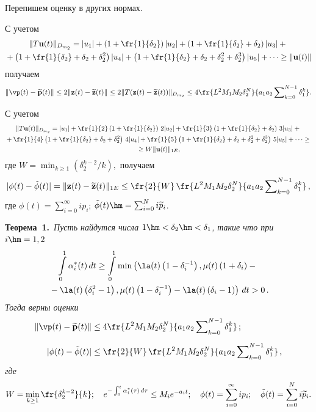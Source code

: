 \smallskip

Перепишем оценку в других нормах.

С  учетом
\begin{multline*}
\|T\vu(t)\|_{D_{m_2}}=|u_1|+\left(1+\fr{1}{\delta_2}\right)|u_2|+
\left(1+\fr{1}{\delta_2}+\delta_2\right)|u_3|+{}
\\
{}+\left(1+\fr{1}{\delta_2}+\delta_2+\delta_2^2\right)|u_4|+
\left(1+\fr{1}{\delta_2}+\delta_2+\delta_2^2+\delta_2^3\right)|u_5|+\cdots \ge\|\vu(t)\|
\end{multline*}
получаем
\begin{equation*}
\|\vp(t)-\vwp(t)\|\le 2 \|\vz(t)-\vwz(t)\| \le 2 \|T(\vz(t)-\vwz(t))\|_{D_{m_2}} 
\le  4   \fr{L^2M_1M_2 \delta_2^N}{a_1a_2\sum\nolimits_{k=0}^{N-1}\delta_1^{k}}.
\end{equation*}


С  учетом
\begin{multline*}
\|T\vu(t)\|_{D_{m_2}}= |u_1|+\fr{1}{2} \left(1+\fr {1}{\delta_2}\right)\, 2|u_2|+\fr{1}{3}
 \left(1+\fr {1}{\delta_2}+\delta_2\right)\, 3|u_3|+{}
\\
{}+\fr{1}{4}\left(1+\fr{1}{\delta_2}+\delta_2+\delta_2^2\right)\, 4|u_4|+
\fr{1}{5}\left(1+\fr{1}{\delta_2}+\delta_2+\delta_2^2+\delta_2^3\right)\, 5|u_5|+\cdots \ge{}\\
{}\ge W\|\vu(t)\|_{1E},
\end{multline*}
где $W=\min\nolimits_{k\ge 1}({\delta_2^{k-2}}/{k}),$
получаем
\begin{equation*}
|\phi(t)-\tilde{\phi}(t)|=\|\vz(t)-\vwz(t)\|_{1E}\le \fr{2}{W}\,
\fr{L^2M_1M_2 \delta_2^N}{a_1a_2\sum\nolimits_{k=0}^{N-1}\delta_1^{k}}\,,
\end{equation*}
где  $\phi(t)=\sum\nolimits_{i=0}^{\infty} i p_i$; $\tilde\phi(t)\hm=\sum\nolimits_{i=0}^{N} i \wwp_i$.

\pagebreak


\noindent
\textbf{Теорема~1.}\
\textit{Пусть найдутся числа $1 \hm< \delta_2\hm < \delta_1$, такие что при $i\hm=1,2$}
\begin{multline*}
\int\limits_0^1 \alpha_i^*(t)\, dt \ge \int\limits_0^1 \min \left(\la(t)\left(1-\delta_i^{-1}\right), \mu(t)
\left(1+\delta_i\right)-{}\right. \\
\left.{}- \la(t)\left(\delta_i^{2}-1\right), \mu(t)
\left(1-\delta_i^{-1}\right)- \la(t)\left(\delta_i-1\right) \right)\, dt >0\,.
\end{multline*}  
\textit{Тогда верны оценки}
\begin{align*}
\|\vp(t)-\vwp(t)\| &\le  4   \fr{L^2M_1M_2 \delta_2^N}{a_1a_2\sum\nolimits_{k=0}^{N-1}\delta_1^{k}}\,;
\\[6pt]
|\phi(t)-\tilde{\phi}(t)|&\le \fr{2}{W}\,\fr{L^2M_1M_2 \delta_2^N}{a_1a_2\sum\nolimits_{k=0}^{N-1}\delta_1^{k}}\,,
\end{align*}
\textit{где}
 $$
 W=\min\limits_{k\ge 1} \fr{\delta_2^{k-2}}{k};\quad
e^{-\int\nolimits_0^t\alpha_i^*(\tau)\, d\tau}\le M_i e^{-a_it};\quad
\phi(t)=\sum\limits_{i=0}^{\infty} i p_i;\quad
 \tilde\phi(t)=\sum\limits_{i=0}^{N} i \wwp_i.
 $$



